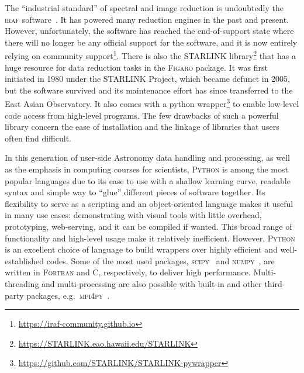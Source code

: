 \documentclass[linenumbers, twocolumn]{aastex631}
\begin{document}
The ``industrial standard'' of spectral and image reduction is undoubtedly
the \textsc{iraf} software~\citep{1986SPIE..627..733T, 1993ASPC...52..173T}.
It has powered many reduction engines in the past and present. However,
unfortunately, the software has reached the end-of-support state where there
will no longer be any official support for the software, and it is now
entirely relying on community support\footnote{\url{https://iraf-community.github.io}}.
There is also the \textsc{STARLINK}
library\footnote{\url{https://STARLINK.eao.hawaii.edu/STARLINK}}\citep{2014ASPC..485..391C, 2022ASPC..532..559B}
that has a huge resource for data reduction tasks in the \textsc{Figaro} package. It was first initiated
in 1980 under the STARLINK Project, which became defunct in 2005, but the
software survived and its maintenance effort has since transferred to the
East Asian Observatory. It also comes with a python
wrapper\footnote{\url{https://github.com/STARLINK/STARLINK-pywrapper}}
to enable low-level code access from high-level programs. The few drawbacks
of such a powerful library concern the ease of installation and the
linkage of libraries that users often find difficult.

In this generation of user-side Astronomy data handling and processing, as
well as the emphasis in computing courses for scientists, \textsc{Python} is
among the most popular languages due to its ease to use with a shallow learning
curve, readable syntax and simple way to ``glue'' different pieces of software
together. Its flexibility to serve as a scripting and an object-oriented
language makes it useful in many use cases: demonstrating with visual tools
with little overhead, prototyping, web-serving, and it can be compiled if
wanted. This broad range of functionality and high-level usage make it
relatively inefficient. However, \textsc{Python} is an excellent choice of
language to build wrappers over highly efficient and well-established codes.
Some of the most used packages, \textsc{scipy}~\citep{2020SciPy-NMeth}
and \textsc{numpy}~\citep{2020NumPy-Array}, are written in \textsc{Fortran}
and \textsc{C}, respectively, to deliver high performance. Multi-threading
and multi-processing are also possible with built-in and other third-party
packages, e.g.\ \textsc{mpi4py}~\citep{DALCIN20111124}. 
\end{document}
